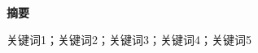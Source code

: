
\begin{center}
{\Large\bfseries 摘要}
\end{center}

\vspace{0.5em}





\vspace{1em}
关键词1；关键词2；关键词3；关键词4；关键词5
